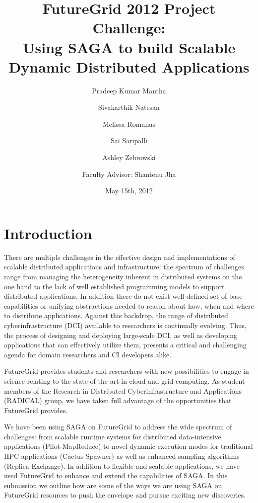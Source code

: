 \documentclass[]{paper}
\begin{document}
\title{FutureGrid 2012 Project Challenge:\\ Using SAGA to build Scalable Dynamic Distributed Applications}
\author{Pradeep Kumar Mantha 
  \and Sivakarthik Natesan 
  \and Melissa Romanus \\
  \and Sai Saripalli 
  \and Ashley Zebrowski 
  \and \large{Faculty Advisor: Shantenu Jha}\\
  }

\date{May 15th, 2012}
\maketitle

\begin{abstract}
\end{abstract}

\section{Introduction}


There are multiple challenges in the effective design and implementations of scalable distributed applications and infrastructure: the spectrum of challenges range from managing the heterogeneity inherent in distributed systems on the one hand to the lack of well established programming models to support distributed applications. In addition there do not exist well defined set of base capabilities or unifying abstractions needed to reason about how, when and where to distribute applications. Against this backdrop, the range of distributed cyberinfrastructure (DCI) available to researchers is continually evolving.  Thus, the process of designing and deploying large-scale DCI, as well as developing applications that can effectively utilize them, presents a critical and challenging agenda for domain researchers and CI developers alike.

FutureGrid provides students and researchers with new possibilities to
engage in science relating to the state-of-the-art in cloud and grid
computing.  As student members of the Research in Distributed
Cyberinfrastructure and Applications (RADICAL) group, we have taken
full advantage of the opportunities that FutureGrid provides.

We have been using SAGA on FutureGrid to address the wide spectrum of challenges: from scalable runtime systems for distributed data-intensive applications (Pilot-MapReduce) to novel dynamic execution modes for traditional HPC applications (Cactus-Spawner) as well as enhanced sampling algorithms (Replica-Exchange).  In addition to flexible and scalable applications, we have used FutureGrid to enhance and extend the capabilities of SAGA.  In this submission we outline how are some of the ways we are using SAGA on FutureGrid resources to push the envelope and pursue exciting new discoveries.
\end{document}
